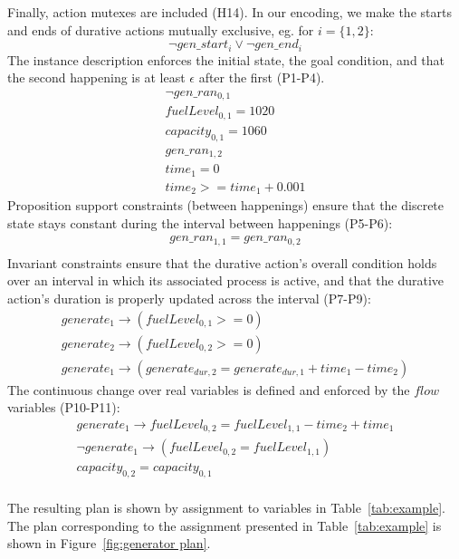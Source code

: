 Finally, action mutexes are included (H14). In our encoding, we make the starts and ends of durative actions mutually exclusive, eg. for $i=\{1,2\}$:
$$
\neg gen\_start_i \vee \neg gen\_end_i
$$
The instance description enforces the initial state, the goal condition, and that the second happening is at least $\epsilon$ after the first (P1-P4).
$$
\begin{array}{l}
\neg gen\_ran_{0,1} \\
fuelLevel_{0,1} = 1020 \\
capacity_{0,1} = 1060 \\
gen\_ran_{1,2} \\
time_1 = 0 \\
time_2 >= time_1 + 0.001
\end{array}
$$
Proposition support constraints (between happenings) ensure that the discrete state stays constant during the interval between happenings (P5-P6):
$$
\begin{array}{l}
gen\_ran_{1,1} = gen\_ran_{0,2} \\
\end{array}
$$
Invariant constraints ensure that the durative action's overall condition holds over an interval in which its associated process is active, and that the durative action's duration is properly updated across the interval (P7-P9):
$$
\begin{array}{l}
generate_1 \rightarrow (fuelLevel_{0,1} >= 0) \\
generate_2 \rightarrow (fuelLevel_{0,2} >= 0) \\
generate_1 \rightarrow (generate_{dur,2} = generate_{dur,1} + time_1 - time_2)
\end{array}
$$
The continuous change over real variables is defined and enforced by the $flow$ variables (P10-P11):
$$
\begin{array}{l}
generate_1 \rightarrow fuelLevel_{0,2} = fuelLevel_{1,1} - time_2 + time_1 \\
\neg generate_1 \rightarrow (fuelLevel_{0,2} = fuelLevel_{1,1}) \\
capacity_{0,2} = capacity_{0,1} \\
\end{array}
$$

The resulting plan is shown by assignment to variables in Table~\ref{tab:example}. The plan corresponding to the assignment presented in Table~\ref{tab:example} is shown in Figure~\ref{fig:generator plan}.

